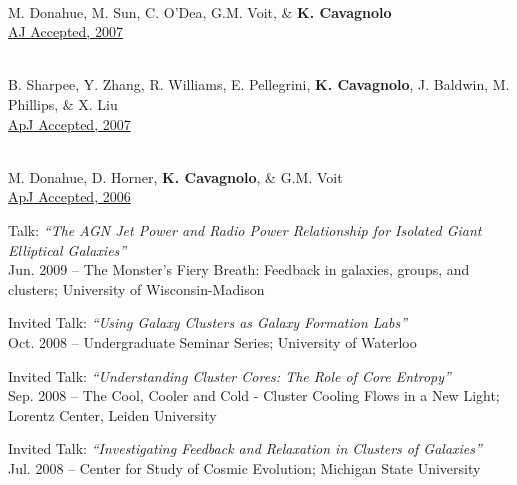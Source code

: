 \documentclass[12pt]{cv}
\begin{document}
\begin{llist}
{}\\
M. Donahue, M. Sun, C. O'Dea, G.M. Voit, \& {\bf K. Cavagnolo}\\
\href{http://adsabs.harvard.edu/abs/2007AJ....134...14D}{AJ Accepted, 2007}

{}\\
B. Sharpee, Y. Zhang, R. Williams, E. Pellegrini, {\bf K. Cavagnolo}, J. Baldwin, M. Phillips, \& X. Liu\\
\href{http://adsabs.harvard.edu/abs/2007ApJ...659.1265S}{ApJ Accepted, 2007}

{}\\
M. Donahue, D. Horner, {\bf K. Cavagnolo}, \& G.M. Voit\\
\href{http://adsabs.harvard.edu/abs/2006ApJ...643..730D}{ApJ Accepted, 2006}




{\sc Talk: {\textit{``The AGN Jet Power and Radio Power Relationship for Isolated Giant Elliptical Galaxies''}}}\\
Jun. 2009 -- The Monster's Fiery Breath: Feedback in galaxies, groups, and clusters; University of Wisconsin-Madison

{\sc Invited Talk: {\textit{``Using Galaxy Clusters as Galaxy Formation Labs''}}}\\
Oct. 2008 -- Undergraduate Seminar Series; University of Waterloo

{\sc Invited Talk: {\textit{``Understanding Cluster Cores: The Role of Core Entropy''}}}\\
Sep. 2008 -- The Cool, Cooler and Cold - Cluster Cooling Flows in a New Light; Lorentz Center, Leiden University

{\sc Invited Talk: {\textit{``Investigating Feedback and Relaxation in Clusters of Galaxies''}}}\\
Jul. 2008 -- Center for Study of Cosmic Evolution; Michigan State University


\end{llist}
\end{document}
